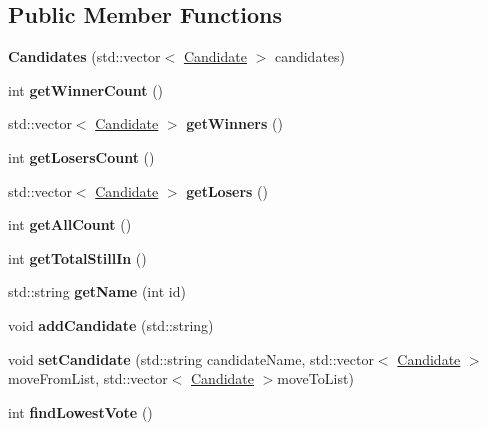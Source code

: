 \subsection*{Public Member Functions}
\begin{DoxyCompactItemize}
\item 
\mbox{\label{classCandidates_a01101d31a39bf9ecfac19dfd410a4e2b}} 
{\bfseries Candidates} (std\+::vector$<$ \hyperlink{classCandidate}{Candidate} $>$ candidates)
\item 
\mbox{\label{classCandidates_a5b0d5526b0404d62eacf9508fa0d734a}} 
int {\bfseries get\+Winner\+Count} ()
\item 
\mbox{\label{classCandidates_aab9db44b4a11c2f64d9e6906fdc4fd59}} 
std\+::vector$<$ \hyperlink{classCandidate}{Candidate} $>$ {\bfseries get\+Winners} ()
\item 
\mbox{\label{classCandidates_a60467d71e75d8435ff6df2f2fc4f64ae}} 
int {\bfseries get\+Losers\+Count} ()
\item 
\mbox{\label{classCandidates_a5adad2ad59f565081bc723e03b3ab7c2}} 
std\+::vector$<$ \hyperlink{classCandidate}{Candidate} $>$ {\bfseries get\+Losers} ()
\item 
\mbox{\label{classCandidates_a0e1a401227fc4edc7017a555c600ce88}} 
int {\bfseries get\+All\+Count} ()
\item 
\mbox{\label{classCandidates_a1e83512f338373dd37cfdbc1c465ebaf}} 
int {\bfseries get\+Total\+Still\+In} ()
\item 
\mbox{\label{classCandidates_a0572a194cae9dd16480de5ecd199994a}} 
std\+::string {\bfseries get\+Name} (int id)
\item 
\mbox{\label{classCandidates_aa5a6ed6278777269d02810ff666e8ab5}} 
void {\bfseries add\+Candidate} (std\+::string)
\item 
\mbox{\label{classCandidates_aa64ba83a526524c5d72666c86e2a0fd5}} 
void {\bfseries set\+Candidate} (std\+::string candidate\+Name, std\+::vector$<$ \hyperlink{classCandidate}{Candidate} $>$ move\+From\+List, std\+::vector$<$ \hyperlink{classCandidate}{Candidate} $>$move\+To\+List)
\item 
\mbox{\label{classCandidates_ae8c7d64cda478b622414cd3ba5c172e6}} 
int {\bfseries find\+Lowest\+Vote} ()
\end{DoxyCompactItemize}
